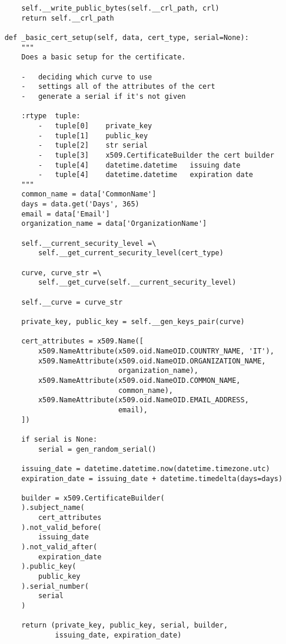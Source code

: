 \begin{verbatim}
        self.__write_public_bytes(self.__crl_path, crl)
        return self.__crl_path

    def _basic_cert_setup(self, data, cert_type, serial=None):
        """
        Does a basic setup for the certificate.

        -   deciding which curve to use
        -   settings all of the attributes of the cert
        -   generate a serial if it's not given

        :rtype  tuple:
            -   tuple[0]    private_key
            -   tuple[1]    public_key
            -   tuple[2]    str serial
            -   tuple[3]    x509.CertificateBuilder the cert builder
            -   tuple[4]    datetime.datetime   issuing date
            -   tuple[4]    datetime.datetime   expiration date
        """
        common_name = data['CommonName']
        days = data.get('Days', 365)
        email = data['Email']
        organization_name = data['OrganizationName']

        self.__current_security_level =\
            self.__get_current_security_level(cert_type)

        curve, curve_str =\
            self.__get_curve(self.__current_security_level)

        self.__curve = curve_str

        private_key, public_key = self.__gen_keys_pair(curve)

        cert_attributes = x509.Name([
            x509.NameAttribute(x509.oid.NameOID.COUNTRY_NAME, 'IT'),
            x509.NameAttribute(x509.oid.NameOID.ORGANIZATION_NAME,
                               organization_name),
            x509.NameAttribute(x509.oid.NameOID.COMMON_NAME,
                               common_name),
            x509.NameAttribute(x509.oid.NameOID.EMAIL_ADDRESS,
                               email),
        ])

        if serial is None:
            serial = gen_random_serial()

        issuing_date = datetime.datetime.now(datetime.timezone.utc)
        expiration_date = issuing_date + datetime.timedelta(days=days)

        builder = x509.CertificateBuilder(
        ).subject_name(
            cert_attributes
        ).not_valid_before(
            issuing_date
        ).not_valid_after(
            expiration_date
        ).public_key(
            public_key
        ).serial_number(
            serial
        )

        return (private_key, public_key, serial, builder,
                issuing_date, expiration_date)        


\end{verbatim}
